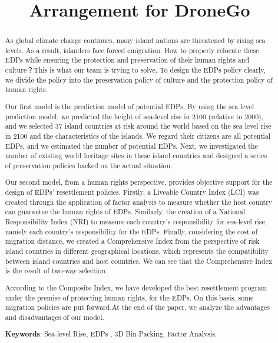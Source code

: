 \documentclass[12pt]{article}  %
\title{Arrangement for DroneGo}  %
\begin{document}
\begin{abstract}

As global climate change continues, many island nations are threatened by rising sea levels. As a result, islanders face forced emigration. How to properly relocate these EDPs while ensuring the protection and preservation of their human rights and culture？This is what our team is trying to solve. To design the EDPs policy clearly, we divide the policy into the preservation policy of culture and the protection policy of human rights.

Our first model is the prediction model of potential EDPs. By using the sea level prediction model, we predicted the height of sea-level rise in 2100 (relative to 2000), and we selected 37 island countries at risk around the world based on the sea level rise in 2100 and the characteristics of the islands. We regard their citizens are all potential EDPs, and we estimated the number of potential EDPs. Next, we investigated the number of existing world heritage sites in these island countries and designed a series of preservation policies backed on the actual situation.

Our second model, from a human rights perspective, provides objective support for the design of EDPs' resettlement policies. Firstly, a Liveable Country Index (LCI) was created through the application of factor analysis to measure whether the host country can guarantee the human rights of EDPs. Similarly, the creation of a National Responsibility Index (NRI) to measure each country's responsibility for sea-level rise, namely each country's responsibility for the EDPs. Finally, considering the cost of migration distance, we created a Comprehensive Index from the perspective of risk island countries in different geographical locations, which represents the compatibility between island countries and host countries. We can see that the Comprehensive Index is the result of two-way selection.

According to the Composite Index, we have developed the best resettlement program under the premise of protecting human rights, for the EDPs. On this basis, some migration policies are put forward.At the end of the paper, we analyze the advantages and disadvantages of our model.


     \vspace{5pt}
     \textbf{Keywords}: Sea-level Rise, EDPs , 3D Bin-Packing, Factor Analysis.



\end{abstract}
\end{document}
